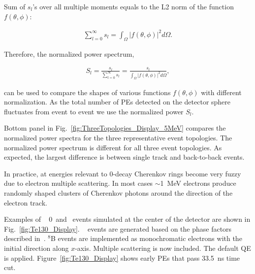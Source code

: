 Sum of $s_l$'s over all multiple moments equals to the L2 norm of the function $f(\theta,\phi)$:

\begin{eqnarray}
\label{eq5}
\sum_{l=0}^{\infty} s_l = \int_{\Omega} |f(\theta,\phi)|^2 d\Omega.
\end{eqnarray}

Therefore, the normalized power spectrum,

\begin{eqnarray}
\label{eq6}
S_l = \frac{s_l}{\sum_{l=0}^{\infty} s_l} =  \frac{s_l}{\int_{\Omega} |f(\theta,\phi)|^2 d\Omega},
\end{eqnarray}

can be used to compare the shapes of various functions $f(\theta,\phi)$ with different normalization. As the total number of PEs detected on the detector sphere fluctuates from event to event we use the normalized power $S_l$.

Bottom panel in Fig.~\ref{fig:ThreeTopologies_Display_5MeV} compares the normalized power spectra for the three representative event topologies.
The normalized power spectrum is different for all three event topologies. As expected, the largest difference is between single track and
back-to-back events.

In practice, at energies relevant to 0\nbb-decay Cherenkov rings become very fuzzy due to electron multiple scattering. In most cases $\sim$1~MeV 
electrons produce randomly shaped clusters of Cherenkov photons around the direction of the electron track. 



Examples of \Te~ 0\nbb~and \B~events simulated at the center of the detector are shown in Fig.~\ref{fig:Te130_Display}. 
\Te~ events are generated based on the phase factors described in~\cite{Kotila_phase_factors}.
$^{8}$B events are implemented as monochromatic electrons with the initial direction along $x$-axis. Multiple scattering is now included.
The default QE is applied. Figure~\ref{fig:Te130_Display} shows early PEs that pass 33.5~ns time cut.

